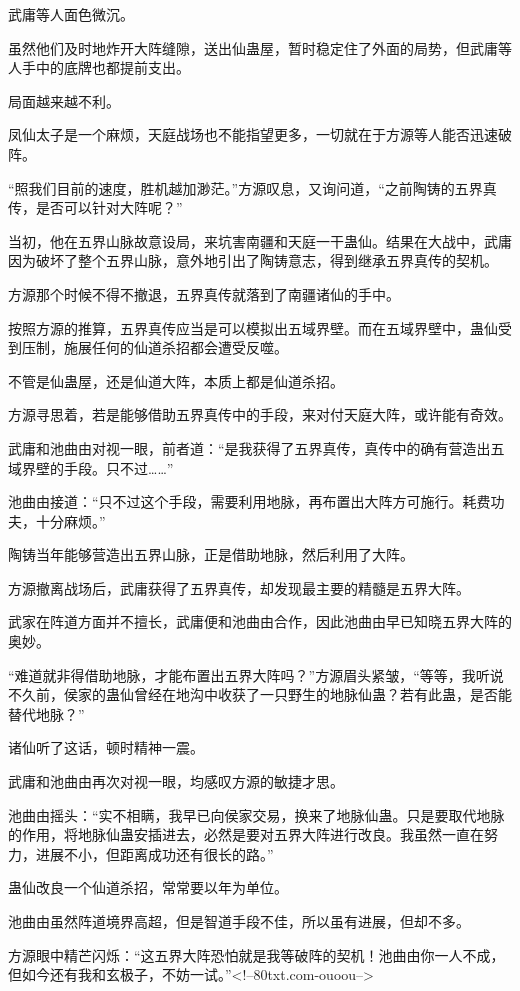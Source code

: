 \begin{this_body}
武庸等人面色微沉。

虽然他们及时地炸开大阵缝隙，送出仙蛊屋，暂时稳定住了外面的局势，但武庸等人手中的底牌也都提前支出。

局面越来越不利。

凤仙太子是一个麻烦，天庭战场也不能指望更多，一切就在于方源等人能否迅速破阵。

“照我们目前的速度，胜机越加渺茫。”方源叹息，又询问道，“之前陶铸的五界真传，是否可以针对大阵呢？”

当初，他在五界山脉故意设局，来坑害南疆和天庭一干蛊仙。结果在大战中，武庸因为破坏了整个五界山脉，意外地引出了陶铸意志，得到继承五界真传的契机。

方源那个时候不得不撤退，五界真传就落到了南疆诸仙的手中。

按照方源的推算，五界真传应当是可以模拟出五域界壁。而在五域界壁中，蛊仙受到压制，施展任何的仙道杀招都会遭受反噬。

不管是仙蛊屋，还是仙道大阵，本质上都是仙道杀招。

方源寻思着，若是能够借助五界真传中的手段，来对付天庭大阵，或许能有奇效。

武庸和池曲由对视一眼，前者道：“是我获得了五界真传，真传中的确有营造出五域界壁的手段。只不过……”

池曲由接道：“只不过这个手段，需要利用地脉，再布置出大阵方可施行。耗费功夫，十分麻烦。”

陶铸当年能够营造出五界山脉，正是借助地脉，然后利用了大阵。

方源撤离战场后，武庸获得了五界真传，却发现最主要的精髓是五界大阵。

武家在阵道方面并不擅长，武庸便和池曲由合作，因此池曲由早已知晓五界大阵的奥妙。

“难道就非得借助地脉，才能布置出五界大阵吗？”方源眉头紧皱，“等等，我听说不久前，侯家的蛊仙曾经在地沟中收获了一只野生的地脉仙蛊？若有此蛊，是否能替代地脉？”

诸仙听了这话，顿时精神一震。

武庸和池曲由再次对视一眼，均感叹方源的敏捷才思。

池曲由摇头：“实不相瞒，我早已向侯家交易，换来了地脉仙蛊。只是要取代地脉的作用，将地脉仙蛊安插进去，必然是要对五界大阵进行改良。我虽然一直在努力，进展不小，但距离成功还有很长的路。”

蛊仙改良一个仙道杀招，常常要以年为单位。

池曲由虽然阵道境界高超，但是智道手段不佳，所以虽有进展，但却不多。

方源眼中精芒闪烁：“这五界大阵恐怕就是我等破阵的契机！池曲由你一人不成，但如今还有我和玄极子，不妨一试。”<!--80txt.com-ouoou-->

\end{this_body}

